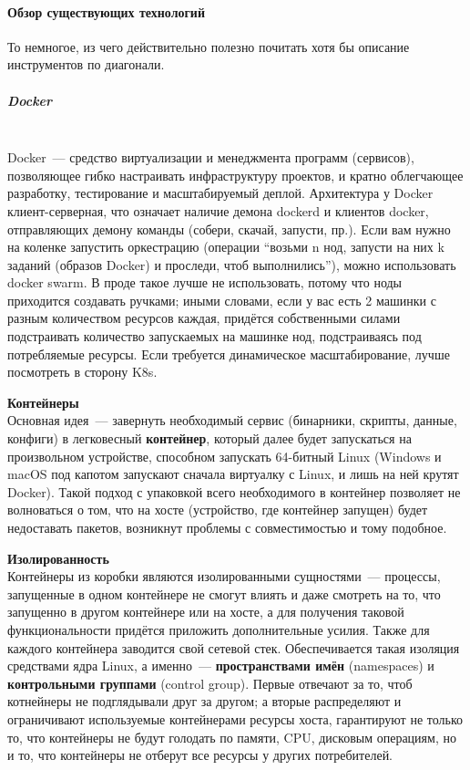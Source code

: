 \paragraph{Обзор существующих технологий}
То немногое, из чего действительно полезно почитать хотя бы описание инструментов по диагонали.

\subparagraph{Docker} ~\\

    Docker~--- средство виртуализации и менеджмента программ (сервисов), позволяющее гибко настраивать инфраструктуру проектов, и кратно облегчающее разработку, тестирование и масштабируемый деплой.
    Архитектура у Docker клиент-серверная, что означает наличие демона dockerd и клиентов docker, отправляющих демону команды (собери, скачай, запусти, пр.). Если вам нужно на коленке запустить оркестрацию
    (операции ``возьми n нод, запусти на них k заданий (образов Docker) и проследи, чтоб выполнились''), можно использовать docker swarm. \autocite{DockerSwarmConcepts} В проде такое лучше не использовать,
    потому что ноды приходится создавать ручками; иными словами, если у вас есть 2 машинки с разным количеством ресурсов каждая, придётся собственными силами подстраивать количество запускаемых на машинке нод,
    подстраиваясь под потребляемые ресурсы. Если требуется динамическое масштабирование, лучше посмотреть в сторону K8s.

    \textbf{Контейнеры} ~\\
    Основная идея~--- завернуть необходимый сервис (бинарники, скрипты, данные, конфиги) в легковесный \textbf{контейнер}, который далее будет запускаться на произвольном устройстве, способном запускать
    64-битный Linux (Windows и macOS под капотом запускают сначала виртуалку с Linux, и лишь на ней крутят Docker). Такой подход с упаковкой всего необходимого в контейнер позволяет не волноваться о том,
    что на хосте (устройство, где контейнер запущен) будет недоставать пакетов, возникнут проблемы с совместимостью и тому подобное.

    \textbf{Изолированность} ~\\
    Контейнеры из коробки являются изолированными сущностями~--- процессы, запущенные в одном контейнере не смогут влиять и даже смотреть на то, что запущенно в другом контейнере или на хосте, а для получения
    таковой функциональности придётся приложить дополнительные усилия. Также для каждого контейнера заводится свой сетевой стек.
    Обеспечивается такая изоляция средствами ядра Linux, а именно~--- \textbf{пространствами имён} (namespaces) и \textbf{контрольными группами} (control group). Первые отвечают за то, чтоб котнейнеры
    не подглядывали друг за другом; а вторые распределяют и ограничивают используемые контейнерами ресурсы хоста, гарантируют не только то, что контейнеры не будут голодать по памяти, CPU, дисковым операциям,
    но и то, что контейнеры не отберут все ресурсы у других потребителей.

